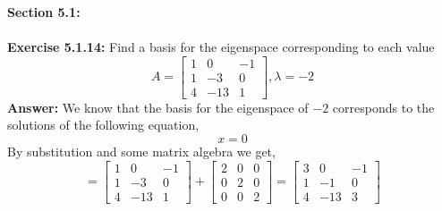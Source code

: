 \documentclass{amsart}
\begin{document}
\thispagestyle{fancy}





{\huge\textbf{Section 5.1:}}\\\\
\noindent\textbf{Exercise 5.1.14: } Find a basis for the eigenspace corresponding to each value
\begin{equation*}
A = 
\begin{bmatrix}
1&0& -1\\ 
1& -3& 0\\
4 &-13& 1
\end{bmatrix}
, \lambda  = - 2
\end{equation*}
\noindent \textbf{Answer: } We know that the basis for the eigenspace of $-2$ corresponds to the solutions of the following equation,
\begin{equation*}
[A - (-2)I]x = 0
\end{equation*}
By substitution and some matrix algebra we get,
\begin{equation*}
[A - (-2)I] = 
\begin{bmatrix}
1&0& -1\\ 
1& -3& 0\\
4 &-13& 1
\end{bmatrix}+
\begin{bmatrix}
2&0& 0\\ 
0& 2& 0\\
0 &0& 2
\end{bmatrix} 
=
\begin{bmatrix}
3&0& -1\\ 
1& -1& 0\\
4 &-13& 3
\end{bmatrix} 
\end{equation*}
\end{document}
